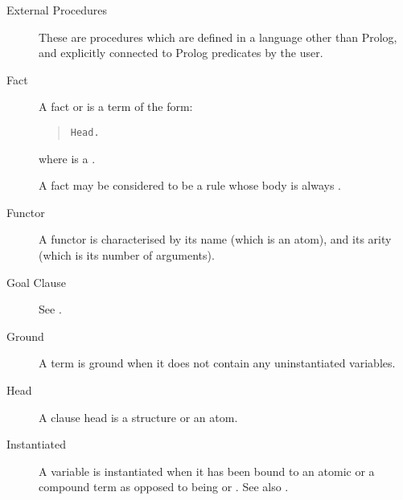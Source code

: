 \begin{description}
\item[External Procedures]
These are procedures which are defined in a language
other than Prolog, and explicitly connected to Prolog predicates by the user.

\item[Fact]
A fact or  is a term of the form:
\begin{quote}
\begin{verbatim}
Head.
\end{verbatim}
\end{quote}
where  is a .

A fact may be considered to be a rule whose body is always .

\item[Functor]
A functor is characterised by its name (which is an atom), and its arity
(which is its number of arguments).

\item[Goal Clause]
See .

\item[Ground]
A term is ground when it does not contain any uninstantiated variables.

\item[Head]
A clause head is a structure or an atom.

\item[Instantiated]
A variable is instantiated when it has been bound to an atomic or a
compound term as opposed to being %
or .
See also .



\end{description}
